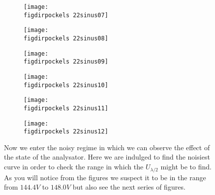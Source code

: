 \flushleft
\begin{figure}
    \begin{subfigure}[b]{\picwidth}
        \texttt{[image: \\figdirpockels 22sinus07]}
        \caption{}
    \end{subfigure}\qquad
    \begin{subfigure}[b]{\picwidth}
        \texttt{[image: \\figdirpockels 22sinus08]}
        \caption{}
    \end{subfigure}
    \begin{subfigure}[b]{\picwidth}
        \texttt{[image: \\figdirpockels 22sinus09]}
        \caption{}
    \end{subfigure}
    \begin{subfigure}[b]{\picwidth}
        \texttt{[image: \\figdirpockels 22sinus10]}
        \caption{}
    \end{subfigure}
    \begin{subfigure}[b]{\picwidth}
        \texttt{[image: \\figdirpockels 22sinus11]}
        \caption{}
    \end{subfigure}
    \begin{subfigure}[b]{\picwidth}
        \texttt{[image: \\figdirpockels 22sinus12]}
        \caption{}
    \end{subfigure}

    \caption{Now we enter the noisy regime in which we can 
        observe the effect of the state of the analysator. 
        Here we are indulged to find the noisiest curve in 
        order to check the range in which the $U_{\lambda / 2}$
        might be to find. As you will notice from the figures we
        suspect it to be in the range from $144.4V$ to $148.0V$
        but also see the next series of figures.}
    \label{fig:sinus2}
\end{figure}


